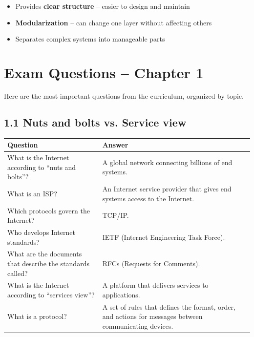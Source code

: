 \begin{keybox}
\begin{itemize}[noitemsep]
    \item Provides \textbf{clear structure} -- easier to design and maintain
    \item \textbf{Modularization} -- can change one layer without affecting others
    \item Separates complex systems into manageable parts
\end{itemize}
\end{keybox}

\section{Exam Questions -- Chapter 1}

Here are the most important questions from the curriculum, organized by topic.

\subsection{1.1 Nuts and bolts vs. Service view}

\begin{exambox}
\begin{longtable}{p{6.5cm}p{7cm}}
\toprule
\textbf{Question} & \textbf{Answer} \\
\midrule
\endhead
What is the Internet according to ``nuts and bolts''? & A global network connecting billions of end systems. \\
\midrule
What is an ISP? & An Internet service provider that gives end systems access to the Internet. \\
\midrule
Which protocols govern the Internet? & TCP/IP. \\
\midrule
Who develops Internet standards? & IETF (Internet Engineering Task Force). \\
\midrule
What are the documents that describe the standards called? & RFCs (Requests for Comments). \\
\midrule
What is the Internet according to ``services view''? & A platform that delivers services to applications. \\
\midrule
What is a protocol? & A set of rules that defines the format, order, and actions for messages between communicating devices. \\
\bottomrule
\end{longtable}
\end{exambox}


